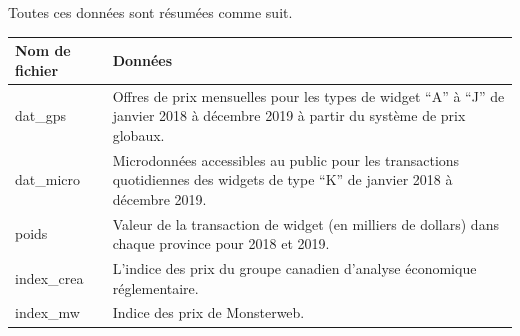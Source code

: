 \documentclass[]{article}
\begin{document}
Toutes ces données sont résumées comme suit.

\begin{longtable}[]{@{}ll@{}}
\toprule
\begin{minipage}[b]{0.47\columnwidth}\raggedright
Nom de fichier\strut
\end{minipage} & \begin{minipage}[b]{0.47\columnwidth}\raggedright
Données\strut
\end{minipage}\tabularnewline
\midrule
\endhead
\begin{minipage}[t]{0.47\columnwidth}\raggedright
dat\_gps\strut
\end{minipage} & \begin{minipage}[t]{0.47\columnwidth}\raggedright
Offres de prix mensuelles pour les types de widget ``A'' à ``J'' de janvier 2018 à décembre 2019 à partir du système de prix globaux.\strut
\end{minipage}\tabularnewline
\begin{minipage}[t]{0.47\columnwidth}\raggedright
dat\_micro\strut
\end{minipage} & \begin{minipage}[t]{0.47\columnwidth}\raggedright
Microdonnées accessibles au public pour les transactions quotidiennes des widgets de type ``K'' de janvier 2018 à décembre 2019.\strut
\end{minipage}\tabularnewline
\begin{minipage}[t]{0.47\columnwidth}\raggedright
poids\strut
\end{minipage} & \begin{minipage}[t]{0.47\columnwidth}\raggedright
Valeur de la transaction de widget (en milliers de dollars) dans chaque province pour 2018 et 2019.\strut
\end{minipage}\tabularnewline
\begin{minipage}[t]{0.47\columnwidth}\raggedright
index\_crea\strut
\end{minipage} & \begin{minipage}[t]{0.47\columnwidth}\raggedright
L'indice des prix du groupe canadien d'analyse économique réglementaire.\strut
\end{minipage}\tabularnewline
\begin{minipage}[t]{0.47\columnwidth}\raggedright
index\_mw\strut
\end{minipage} & \begin{minipage}[t]{0.47\columnwidth}\raggedright
Indice des prix de Monsterweb.\strut
\end{minipage}\tabularnewline
\bottomrule
\end{longtable}
\end{document}
